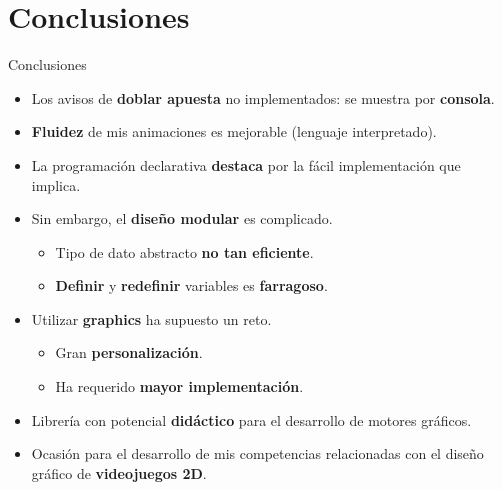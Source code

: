 \section{Conclusiones}

\begin{frame}{Conclusiones}
    \begin{itemize}
        \item Los avisos de \textbf{doblar apuesta} no implementados: se muestra por \textbf{consola}.
        \item \textbf{Fluidez} de mis animaciones es mejorable (lenguaje interpretado). 
         \item La programación declarativa \textbf{destaca} por la fácil implementación que implica.
        \item Sin embargo, el \textbf{diseño modular} es complicado.
        \begin{itemize}
            \item Tipo de dato abstracto \textbf{no tan eficiente}.
            \item \textbf{Definir} y \textbf{redefinir} variables es \textbf{farragoso}.
        \end{itemize}
    \end{itemize}
\end{frame}

\begin{frame}
    \begin{itemize}
        \item Utilizar \textbf{graphics} ha supuesto un reto.
            \begin{itemize}
                \item Gran \textbf{personalización}.
                \item Ha requerido \textbf{mayor implementación}.
            \end{itemize}
        \item Librería con potencial \textbf{didáctico} para el desarrollo de motores gráficos.
        \item Ocasión para el desarrollo de mis competencias relacionadas con el diseño gráfico de \textbf{videojuegos 2D}.
    \end{itemize}
        
    
\end{frame}